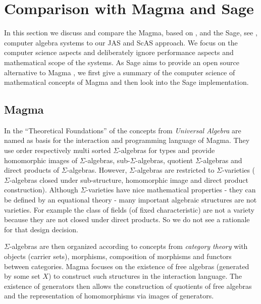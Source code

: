\documentclass{llncs}
\begin{document}
\section{Comparison with Magma and Sage} %
\label{sec:compare}

In this section we discuss and compare the Magma, based on
\cite{BosmaCannonMatthews:1994,BosmaCannonPlayoust:1997}, and the
Sage, see \cite{Stein:2005,SageWiki:2009}, computer algebra systems to
our JAS and ScAS approach. We focus on the computer science aspects
and deliberately ignore performance aspects and mathematical scope of
the systems.
%
As Sage aims to provide an open source alternative to Magma
\cite{SageWiki:2009}, we first give a summary of the computer science
of mathematical concepts of Magma and then look into the Sage
implementation.


\subsection{Magma} %

In the ``Theoretical Foundations'' of \cite{BosmaCannonPlayoust:1997}
the concepts from {\em Universal Algebra} are named as basis for the
interaction and programming language of Magma. They use order
respectively multi sorted $\Sigma$-algebras for types and provide
homomorphic images of $\Sigma$-algebras, sub-$\Sigma$-algebras,
quotient $\Sigma$-algebras and direct products of $\Sigma$-algebras.
%
However, $\Sigma$-algebras are restricted to $\Sigma$-varieties
($\Sigma$-algebras closed under sub-structure, homomorphic image and
direct product construction).
Although $\Sigma$-varieties have nice mathematical properties - they
can be defined by an equational theory
- many important algebraic structures are not
varieties. For example the class of fields (of fixed characteristic)
are not a variety because they are not closed under direct products.
So we do not see a rationale for that design decision.

$\Sigma$-algebras are then organized according to concepts from {\em
  category theory} with objects (carrier sets), morphisms, composition
of morphisms and functors between categories. Magma focuses on the
existence of free algebras (generated by some set $X$) to construct
such structures in the interaction language. The existence of
generators then allows the construction of quotients of free algebras
and the representation of homomorphisms via images of generators.
\end{document}
